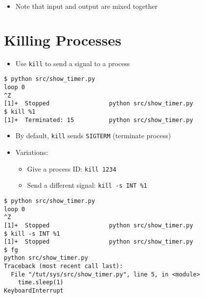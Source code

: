 \documentclass[krantzl]{krantz}
\begin{document}
\begin{itemize}
\item Note that input and output are mixed together

\end{itemize}
\section{Killing Processes}
\begin{itemize}
\item Use \texttt{kill} to send a signal to a process

\end{itemize}
\begin{lstlisting}[frame=tblr,backgroundcolor=\color{black!5}]
$ python src/show_timer.py
loop 0
^Z
[1]+  Stopped                 python src/show_timer.py
$ kill %1
[1]+  Terminated: 15          python src/show_timer.py
\end{lstlisting}

\begin{itemize}
\item By default, \texttt{kill} sends \texttt{SIGTERM} (terminate process)

\item Variations:\begin{itemize}
\item Give a process ID: \texttt{kill 1234}

\item Send a different signal: \texttt{kill -s INT \%1}

\end{itemize}


\end{itemize}
\begin{lstlisting}[frame=tblr,backgroundcolor=\color{black!5}]
$ python src/show_timer.py
loop 0
^Z
[1]+  Stopped                 python src/show_timer.py
$ kill -s INT %1
[1]+  Stopped                 python src/show_timer.py
$ fg
python src/show_timer.py
Traceback (most recent call last):
  File "/tut/sys/src/show_timer.py", line 5, in <module>
    time.sleep(1)
KeyboardInterrupt
\end{lstlisting}
\end{document}
